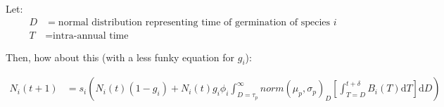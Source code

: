 \documentclass[11pt,a4paper,oneside]{article}
\begin{document}
\noindent Let:
\begin{align*}
D & = \text{normal distribution representing time of germination of species }i\\
T & = \text{intra-annual time}
\end{align*}

\noindent Then, how about this (with a less funky equation for \(g_{i}\)):

\begin{align*}
N_{i}(t+1) & =
s_{i}(N_{i}(t)(1-g_{i})+N_{i}(t)g_{i}\phi_{i}\int_{D=\tau_{p}}^{\infty}norm(\mu_{p}, \sigma_{p})_{D} [\int_{T=D}^{t+\delta}B_{i}(T) \mathrm{d}T] \mathrm{d}D)
\end{align*}
\end{document}

